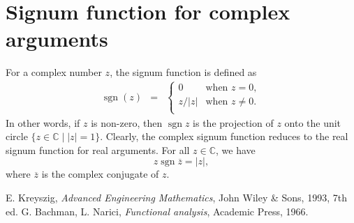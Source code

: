 \documentclass[12pt]{article}
\newcommand{\signum}[0]{\mathop{\mathrm{sgn}}}
\begin{document}
\section{Signum function for complex arguments}
For a complex number $z$, the signum function is defined as \cite{bachman}
 \begin{eqnarray*}
 \signum (z) &=& \left\{ \begin {array}{ll} 
  0 & \mbox{when}\,\, z=0,\\
  {z}/{|z|} & \mbox{when}\,\, z\neq 0. \\ \end{array} \right.
 \end{eqnarray*}
In other words, if $z$ is non-zero, then $\signum z$ is the projection 
of $z$ onto the unit circle $\{z\in \mathbb{C} \mid |z| = 1\}$.
Clearly, the complex signum function reduces to the real signum function
for real arguments. 
For all $z\in \mathbb{C}$, we have
$$ z \signum \overline{z} = |z|,$$
where $\overline{z}$ is the complex conjugate of $z$. 

\begin{thebibliography}{9}
  E. Kreyszig,
 \emph{Advanced Engineering Mathematics},
 John Wiley \& Sons, 1993, 7th ed.
  G. Bachman, L. Narici, 
\emph{Functional analysis}, Academic Press, 1966.
 \end{thebibliography}
\end{document}
